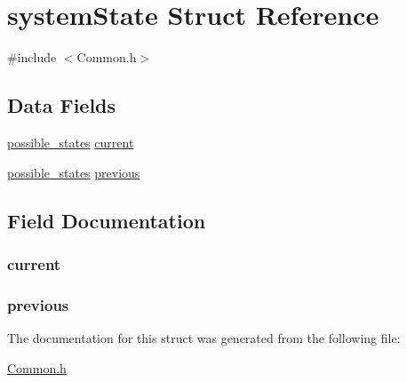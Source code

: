 \hypertarget{structsystem_state}{\section{system\+State Struct Reference}
\label{structsystem_state}
}


{\ttfamily \#include $<$Common.\+h$>$}

\subsection*{Data Fields}
\begin{DoxyCompactItemize}
\item 
\hyperlink{_common_8h_a05931287b056487cf89495f39026fbe1}{possible\+\_\+states} \hyperlink{structsystem_state_a18284a4a782e71c070e1d2e80734509d}{current}
\item 
\hyperlink{_common_8h_a05931287b056487cf89495f39026fbe1}{possible\+\_\+states} \hyperlink{structsystem_state_af2f2716b4afa23c8b53a9351a0924b6b}{previous}
\end{DoxyCompactItemize}


\subsection{Field Documentation}
\hypertarget{structsystem_state_a18284a4a782e71c070e1d2e80734509d}{
\subsubsection[{current}]{ current}}\label{structsystem_state_a18284a4a782e71c070e1d2e80734509d}
\hypertarget{structsystem_state_af2f2716b4afa23c8b53a9351a0924b6b}{
\subsubsection[{previous}]{ previous}}\label{structsystem_state_af2f2716b4afa23c8b53a9351a0924b6b}


The documentation for this struct was generated from the following file\+:\begin{DoxyCompactItemize}
\item 
\hyperlink{_common_8h}{Common.\+h}\end{DoxyCompactItemize}
